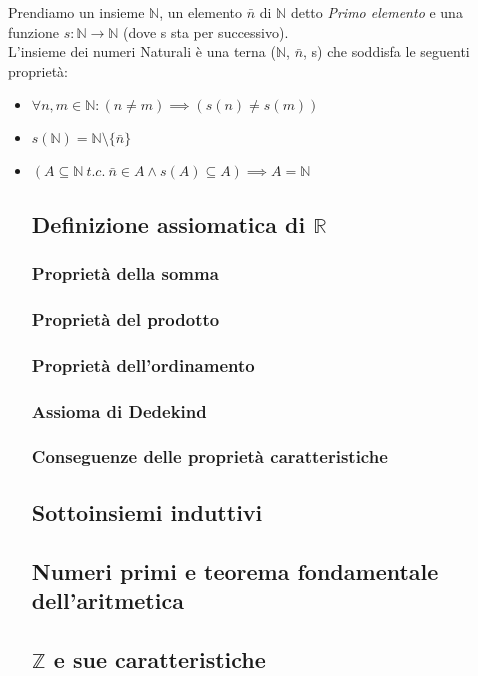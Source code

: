 \documentclass{article}
\begin{document}
  Prendiamo un insieme   $\mathbb{N}$, un elemento $\bar{n}$ di $\mathbb{N}$ detto \textit{
  Primo elemento} e una funzione $s : \mathbb{N} \to \mathbb{N}$ (dove s sta per successivo). \\
  L'insieme dei numeri Naturali è una terna ($\mathbb{N}$, $\bar{n}$, s) che soddisfa le
  seguenti proprietà:
  \begin{itemize}[itemsep=0.05mm]
    \item $\forall n, m \in  \mathbb{N}: (n \neq m) \implies (s(n) \neq s(m))$
    \item $s(\mathbb{N}) = \mathbb{N} \setminus \{\bar{n}\}$
    \item $(A \subseteq \mathbb{N} \: t.c. \: \bar{n} \in A \land s(A) \subseteq A) \implies A = \mathbb{N} $

\subsection{Definizione assiomatica di $\mathbb{R}$}
\subsubsection{Proprietà della somma}
\subsubsection{Proprietà del prodotto}
\subsubsection{Proprietà dell'ordinamento}
\subsubsection{Assioma di Dedekind}
\subsubsection{Conseguenze delle proprietà caratteristiche}

\subsection{Sottoinsiemi induttivi}
\subsection{Numeri primi e teorema fondamentale dell'aritmetica}
\subsection{$\mathbb{Z}$ e sue caratteristiche}

\end{itemize}
\end{document}
